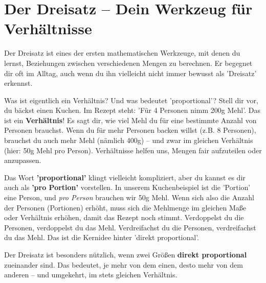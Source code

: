 \section{Der Dreisatz – Dein Werkzeug für Verhältnisse}

Der Dreisatz ist eines der ersten mathematischen Werkzeuge, mit denen du lernst, Beziehungen zwischen verschiedenen Mengen zu berechnen. Er begegnet dir oft im Alltag, auch wenn du ihn vielleicht nicht immer bewusst als 'Dreisatz' erkennst.

\begin{infoboxumgebung}{Was ist eigentlich ein Verhältnis? Und was bedeutet 'proportional'?}
Stell dir vor, du bäckst einen Kuchen. Im Rezept steht: 'Für 4 Personen nimm 200g Mehl'. Das ist ein \textbf{Verhältnis}! Es sagt dir, wie viel Mehl du für eine bestimmte Anzahl von Personen brauchst. Wenn du für mehr Personen backen willst (z.B. 8 Personen), brauchst du auch mehr Mehl (nämlich 400g) – und zwar im gleichen Verhältnis (hier: 50g Mehl pro Person). Verhältnisse helfen uns, Mengen fair aufzuteilen oder anzupassen.

Das Wort \textbf{'proportional'} klingt vielleicht kompliziert, aber du kannst es dir auch als \textbf{'pro Portion'} vorstellen. In unserem Kuchenbeispiel ist die 'Portion' eine Person, und \textit{pro Person} brauchen wir 50g Mehl. Wenn sich also die Anzahl der Personen (Portionen) erhöht, muss sich die Mehlmenge im gleichen Maße oder Verhältnis erhöhen, damit das Rezept noch stimmt. Verdoppelst du die Personen, verdoppelst du das Mehl. Verdreifachst du die Personen, verdreifachst du das Mehl. Das ist die Kernidee hinter 'direkt proportional'.
\end{infoboxumgebung}

Der Dreisatz ist besonders nützlich, wenn zwei Größen \textbf{direkt proportional} zueinander sind. Das bedeutet, je mehr von dem einen, desto mehr von dem anderen – und umgekehrt, im stets gleichen Verhältnis.

